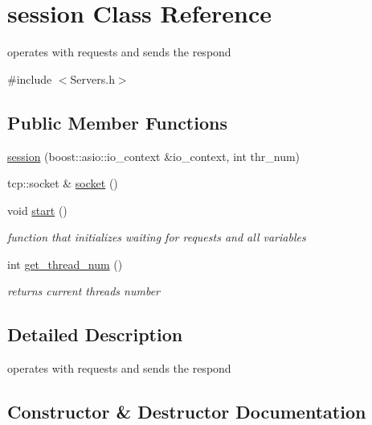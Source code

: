 \hypertarget{classsession}{}\section{session Class Reference}
\label{classsession}


operates with requests and sends the respond  




{\ttfamily \#include $<$Servers.\+h$>$}

\subsection*{Public Member Functions}
\begin{DoxyCompactItemize}
\item 
\hyperlink{classsession_aba171d4b6627a93b189c4accbefac6ba}{session} (boost\+::asio\+::io\+\_\+context \&io\+\_\+context, int thr\+\_\+num)
\item 
tcp\+::socket \& \hyperlink{classsession_a877765bc7124ada6580ad2f748b4d72c}{socket} ()
\item 
\mbox{\label{classsession_ad69144e27f558b8960efae132f2e15f4}} 
void \hyperlink{classsession_ad69144e27f558b8960efae132f2e15f4}{start} ()
\begin{DoxyCompactList}\small\item\em function that initializes waiting for requests and all variables \end{DoxyCompactList}\item 
\mbox{\label{classsession_a79eb1764d3a89cd90b04966918d7dd6c}} 
int \hyperlink{classsession_a79eb1764d3a89cd90b04966918d7dd6c}{get\+\_\+thread\+\_\+num} ()
\begin{DoxyCompactList}\small\item\em returns current thread\textquotesingle{}s number \end{DoxyCompactList}\end{DoxyCompactItemize}


\subsection{Detailed Description}
operates with requests and sends the respond 

\subsection{Constructor \& Destructor Documentation}
\mbox{\label{classsession_aba171d4b6627a93b189c4accbefac6ba}} 

